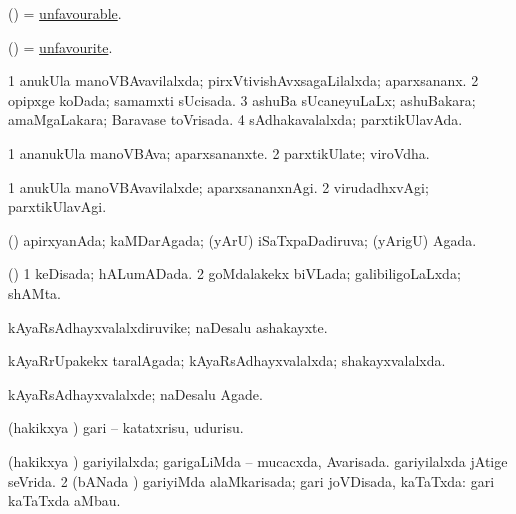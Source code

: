 \bentry
{} 
\gl{\gu}
\expl{}
\bmng
 (\ame) = \hyperlink{unfavourable}{unfavourable}. 
\emng
\eentry

\bentry
{} 
\gl{\gu}
\expl{}
\bmng
 (\ame) = \hyperlink{unfavourite}{unfavourite}. 
\emng
\eentry

\bentry
{} 
\gl{\gu}
\expl{}
\bmng
\bnum
\num{1} anukUla manoVBAvavilalxda; pirxVtivishAvxsagaLilalxda; aparxsananx. 
\num{2} opipxge koDada; samamxti sUcisada. 
\num{3} ashuBa sUcaneyuLaLx; ashuBakara; amaMgaLakara; Baravase toVrisada. 
\num{4} sAdhakavalalxda; parxtikUlavAda. 
\enum
\emng
\eentry

\bentry
{} 
\gl{\nA}
\expl{}
\bmng
\bnum
\num{1} ananukUla manoVBAva; aparxsananxte. 
\num{2} parxtikUlate; viroVdha. 
\enum
\emng
\eentry

\bentry
{} 
\gl{\kirxvi}
\expl{}
\bmng
\bnum
\num{1} anukUla manoVBAvavilalxde; aparxsananxnAgi. 
\num{2} virudadhxvAgi; parxtikUlavAgi. 
\enum
\emng
\eentry

\bentry
{} 
\gl{\gu}
\expl{}
\bmng
 (\AmA) apirxyanAda; kaMDarAgada; (yArU) iSaTxpaDadiruva; (yArigU) Agada. 
\emng
\eentry

\bentry
{} 
\gl{\gu}
\expl{}
\bmng
(\AmA) 
\bnum
\num{1} keDisada; hALumADada. 
\num{2} goMdalakekx biVLada; galibiligoLaLxda; shAMta. 
\enum
\emng
\eentry

\bentry
{} 
\gl{\nA}
\expl{}
\bmng
kAyaRsAdhayxvalalxdiruvike; naDesalu ashakayxte. 
\emng
\eentry

\bentry
{} 
\gl{\gu}
\expl{}
\bmng
 kAyaRrUpakekx taralAgada; kAyaRsAdhayxvalalxda; shakayxvalalxda. 
\emng
\eentry

\bentry
{} 
\gl{\kirxvi}
\expl{}
\bmng
 kAyaRsAdhayxvalalxde; naDesalu Agade. 
\emng
\eentry

\bentry
{} 
\gl{\sakirx}
\expl{}
\bmng
 (hakikxya \vi) gari -- katatxrisu, udurisu. 
\emng
\eentry

\bentry
{} 
\gl{\gu}
\expl{}
\bmng
\bnum
{} (hakikxya \vi) 
\banum
{} gariyilalxda; garigaLiMda -- mucacxda, Avarisada. 
 gariyilalxda jAtige seVrida. 
\eanum
\numie
\num{2} (bANada \vi) gariyiMda alaMkarisada; gari joVDisada, kaTaTxda:  gari kaTaTxda aMbau. 
\enum
\emng
\eentry

